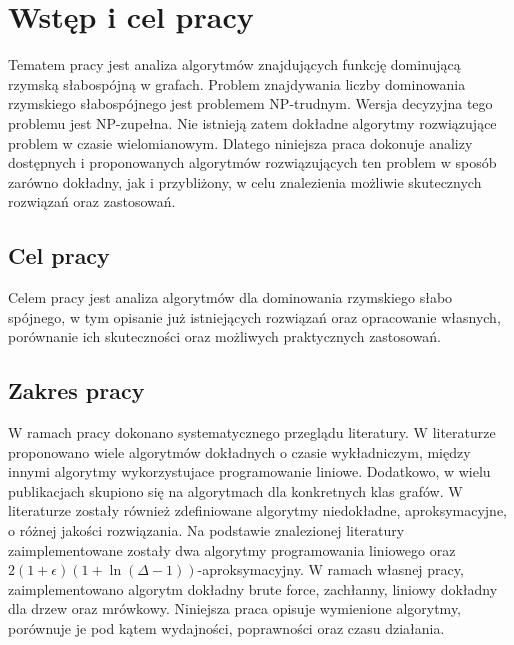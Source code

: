 \chapter{Wstęp i cel pracy}
Tematem pracy jest analiza algorytmów znajdujących funkcję dominującą rzymską słabospójną w grafach.
Problem znajdywania liczby dominowania rzymskiego słabospójnego jest problemem NP-trudnym. Wersja decyzyjna tego problemu jest NP-zupełna. Nie istnieją zatem dokładne algorytmy rozwiązujące problem w czasie wielomianowym. Dlatego niniejsza praca dokonuje analizy dostępnych i proponowanych algorytmów rozwiązujących ten problem w sposób zarówno dokładny, jak i przybliżony, w celu znalezienia możliwie skutecznych rozwiązań oraz zastosowań.

\section{Cel pracy}
Celem pracy jest analiza algorytmów dla dominowania rzymskiego słabo spójnego, w tym opisanie już istniejących rozwiązań oraz opracowanie własnych, porównanie ich skuteczności oraz możliwych praktycznych zastosowań.

\section{Zakres pracy}
W ramach pracy dokonano systematycznego przeglądu literatury. W literaturze proponowano wiele algorytmów dokładnych o czasie wykładniczym, między innymi algorytmy wykorzystujace programowanie liniowe. Dodatkowo, w wielu publikacjach skupiono się na algorytmach dla konkretnych klas grafów. W literaturze zostały również zdefiniowane algorytmy niedokładne, aproksymacyjne, o różnej jakości rozwiązania.
Na podstawie znalezionej literatury zaimplementowane zostały dwa algorytmy programowania liniowego oraz $2(1+\epsilon)(1 + \ln(\Delta - 1))$-aproksymacyjny. W ramach własnej pracy, zaimplementowano algorytm dokładny brute force, zachłanny, liniowy dokładny dla drzew oraz mrówkowy.
Niniejsza praca opisuje wymienione algorytmy, porównuje je pod kątem wydajności, poprawności oraz czasu działania.

